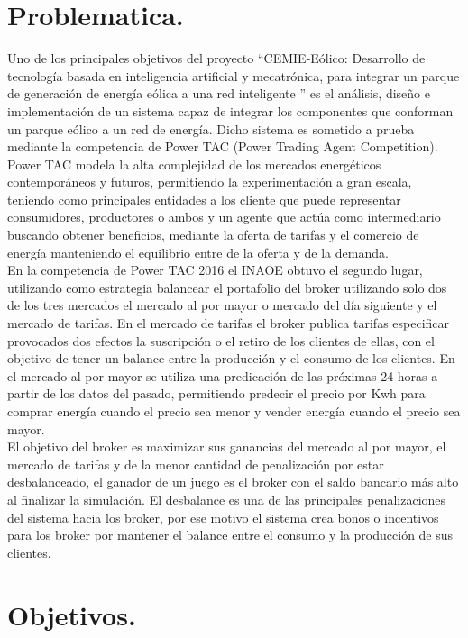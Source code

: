 \section{Problematica.}
Uno de los principales objetivos del proyecto “CEMIE-Eólico: Desarrollo de tecnología basada en inteligencia artificial y mecatrónica, para integrar un parque de generación de energía eólica a una red inteligente  ” es el análisis, diseño e implementación de un sistema capaz de integrar los componentes que conforman un parque eólico a un red de energía. Dicho sistema es sometido a prueba mediante la competencia de Power TAC (Power Trading Agent Competition).
\\

Power TAC modela la alta complejidad de los mercados energéticos contemporáneos y futuros, permitiendo la experimentación a gran escala, teniendo como principales entidades a los cliente que puede representar consumidores,  productores o ambos y un agente que actúa como intermediario buscando obtener beneficios, mediante la oferta de tarifas y el comercio de energía manteniendo el equilibrio entre de la oferta y de la demanda.
\\
 
En la competencia de Power TAC 2016 el INAOE obtuvo el segundo lugar, utilizando como estrategia balancear el portafolio del broker utilizando solo dos de los tres mercados el mercado al por mayor o mercado del día siguiente y el mercado de tarifas. En el mercado de tarifas el broker publica tarifas especificar provocados dos efectos la suscripción o el retiro de los clientes de ellas, con el objetivo de tener un balance entre la producción y el consumo de los clientes. En el mercado al por mayor se utiliza una predicación de las próximas 24 horas a partir de los datos del pasado, permitiendo predecir el precio por Kwh para comprar energía cuando el precio sea menor y vender energía cuando el precio sea mayor.
\\
 
El objetivo del broker es maximizar sus ganancias del mercado al por mayor,  el mercado de tarifas y de la menor cantidad de penalización por estar desbalanceado, el ganador de un juego es el broker con el saldo  bancario más alto al finalizar la simulación. El desbalance es una de las principales penalizaciones del sistema hacia los broker, por ese motivo el sistema crea bonos o incentivos  para los broker por mantener el balance entre el consumo y la producción de sus clientes.

\section{Objetivos.}

